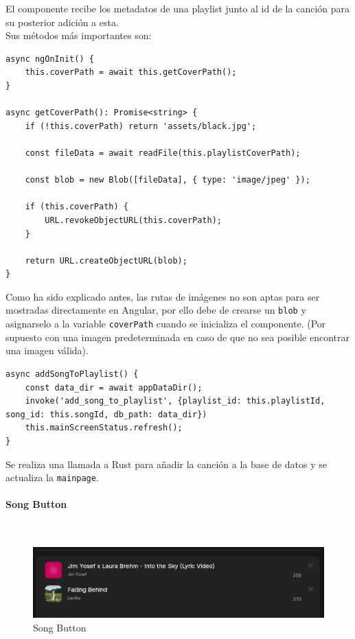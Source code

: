 \documentclass[11pt, a4paper]{article}
\begin{document}
                El componente recibe los metadatos de una playlist junto al id de la canción para su posterior adición a esta. \\

                Sus métodos más importantes son:

                \begin{lstlisting}[caption={getCoverPath()}]
async ngOnInit() {
    this.coverPath = await this.getCoverPath();
}

async getCoverPath(): Promise<string> {
    if (!this.coverPath) return 'assets/black.jpg';

    const fileData = await readFile(this.playlistCoverPath);

    const blob = new Blob([fileData], { type: 'image/jpeg' });

    if (this.coverPath) {
        URL.revokeObjectURL(this.coverPath);
    }

    return URL.createObjectURL(blob);
}
                \end{lstlisting}

                Como ha sido explicado antes, las rutas de imágenes no son aptas para ser mostradas directamente en Angular, por ello debe de crearse un \verb|blob| y asignarselo a la variable \verb|coverPath| cuando se inicializa el componente. (Por supuesto con una imagen predeterminada en caso de que no sea posible encontrar una imagen válida).

                \begin{lstlisting}[caption={addSongToPlaylist()}]
async addSongToPlaylist() {
    const data_dir = await appDataDir();
    invoke('add_song_to_playlist', {playlist_id: this.playlistId, song_id: this.songId, db_path: data_dir})
    this.mainScreenStatus.refresh();
}
                \end{lstlisting}

                Se realiza una llamada a Rust para añadir la canción a la base de datos y se actualiza la \verb|mainpage|.


                \paragraph{Song Button}
                ‎

                \begin{figure}[H]
                    \centering
                    \includegraphics[width=1\textwidth]{media/screenshots/songbutton.png}
                    \caption{Song Button}
                    \label{fig:songbutton}
                \end{figure}
\end{document}
